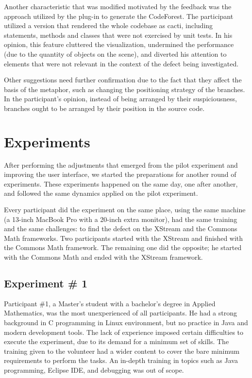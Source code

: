 Another characteristic that was modified motivated by the feedback was the
approach utilized by the plug-in to generate the CodeForest. The participant
utilized a version that rendered the whole codebase as cacti, including
statements, methods and classes that were not exercised by unit tests. In his
opinion, this feature cluttered the visualization, undermined the performance
(due to the quantity of objects on the scene), and diverted his attention to
elements that were not relevant in the context of the defect being investigated.

Other suggestions need further confirmation due to the fact that they affect the
basis of the metaphor, such as changing the positioning strategy of the
branches. In the participant's opinion, instead of being arranged by their
suspiciousness, branches ought to be arranged by their position in the source
code.

\section{Experiments}\label{sec:experiments}

After performing the adjustments that emerged from the pilot experiment and
improving the user interface, we started the preparations for another round of
experiments. These experiments happened on the same day, one after another, and
followed the same dynamics applied on the pilot experiment.

Every participant did the experiment on the same place, using the same machine
(a 13-inch MacBook Pro with a 20-inch extra monitor), had the same training and
the same challenges: to find the defect on the XStream and the Commons Math
frameworks. Two participants started with the XStream and finished with the
Commons Math framework. The remaining one did the opposite; he started with the
Commons Math and ended with the XStream framework.

\subsection{Experiment \# 1}

Participant \#1, a Master's student with a bachelor's degree in Applied
Mathematics, was the most unexperienced of all participants. He had a strong
background in C programming in Linux environment, but no practice in Java and
modern development tools. The lack of experience imposed certain difficulties to
execute the experiment, due to its demand for a minimum set of skills. The
training given to the volunteer had a wider content to cover the bare minimum
requirements to perform the tasks. An in-depth training in topics such as Java
programming, Eclipse IDE, and debugging was out of scope.

